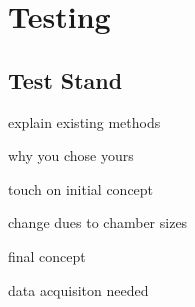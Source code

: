 \section{Testing}

\subsection{Test Stand}

explain existing methods

why you chose yours

touch on initial concept

change dues to chamber sizes

final concept

data acquisiton needed



